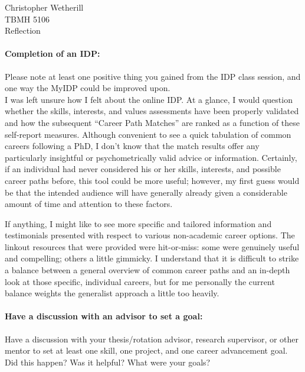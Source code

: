 \documentclass[11pt,letterpaper,final] {article}
\begin{document}

	\noindent Christopher Wetherill\\
	TBMH 5106\\
	Reflection\\[0.4cm]

	\paragraph{Completion of an IDP:} Please note at least one positive thing you gained from the IDP class session, and one way the MyIDP could be improved upon.\\
	
	I was left unsure how I felt about the online IDP. At a glance, I would question whether the skills, interests, and values assessments have been properly validated and how the subsequent ``Career Path Matches'' are ranked as a function of these self-report measures. Although convenient to see a quick tabulation of common careers following a PhD, I don't know that the match results offer any particularly insightful or psychometrically valid advice or information. Certainly, if an individual had never considered his or her skills, interests, and possible career paths before, this tool could be more useful; however, my first guess would be that the intended audience will have generally already given a considerable amount of time and attention to these factors.
	
	If anything, I might like to see more specific and tailored information and testimonials presented with respect to various non-academic career options. The linkout resources that were provided were hit-or-miss: some were genuinely useful and compelling; others a little gimmicky. I understand that it is difficult to strike a balance between a general overview of common career paths and an in-depth look at those specific, individual careers, but for me personally the current balance weights the generalist approach a little too heavily.
	
	\paragraph{Have a discussion with an advisor to set a goal:} Have a discussion with your thesis/rotation advisor, research supervisor, or other mentor to set at least one skill, one project, and one career advancement goal. Did this happen? Was it helpful? What were your goals?\\
	
\end{document}
